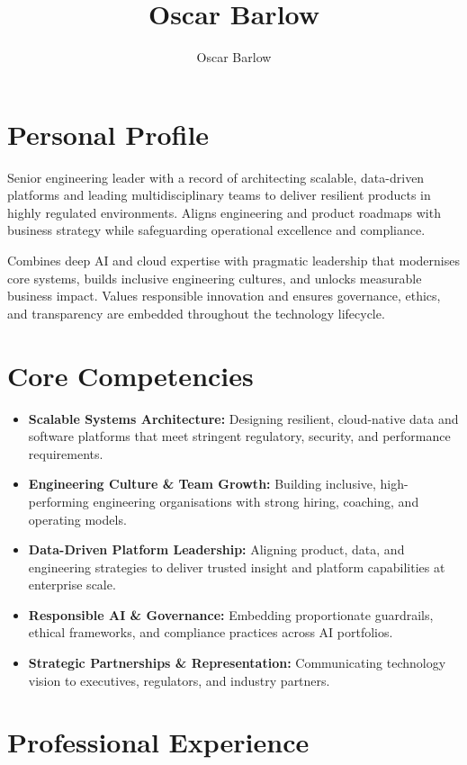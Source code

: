\documentclass[a4paper]{scrartcl}
\author{Oscar Barlow}
\title{Oscar Barlow}
\date{}
\begin{document}
\maketitle

\section*{Personal Profile}
 { %
  \setlength{\parskip}{6pt plus 2pt minus 1pt}
  Senior engineering leader with a record of architecting scalable, data-driven platforms and leading multidisciplinary teams to deliver resilient products in highly regulated environments. Aligns engineering and product roadmaps with business strategy while safeguarding operational excellence and compliance.

  Combines deep AI and cloud expertise with pragmatic leadership that modernises core systems, builds inclusive engineering cultures, and unlocks measurable business impact. Values responsible innovation and ensures governance, ethics, and transparency are embedded throughout the technology lifecycle.
 } %

\section*{Core Competencies}
\begin{itemize}
	\item \textbf{Scalable Systems Architecture:} Designing resilient, cloud-native data and software platforms that meet stringent regulatory, security, and performance requirements.
	\item \textbf{Engineering Culture \& Team Growth:} Building inclusive, high-performing engineering organisations with strong hiring, coaching, and operating models.
	\item \textbf{Data-Driven Platform Leadership:} Aligning product, data, and engineering strategies to deliver trusted insight and platform capabilities at enterprise scale.
	\item \textbf{Responsible AI \& Governance:} Embedding proportionate guardrails, ethical frameworks, and compliance practices across AI portfolios.
		\item \textbf{Strategic Partnerships \& Representation:} Communicating technology vision to executives, regulators, and industry partners.
\end{itemize}

\section*{Professional Experience}
\end{document}
